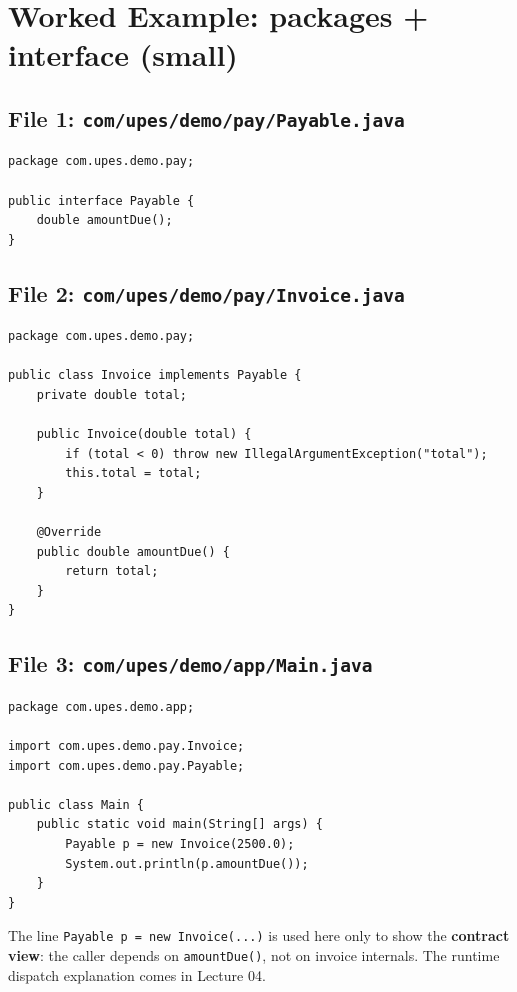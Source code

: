\documentclass[11pt]{article}
\begin{document}
\section{Worked Example: packages + interface (small)}
\subsection*{File 1: \texttt{com/upes/demo/pay/Payable.java}}
\begin{lstlisting}
package com.upes.demo.pay;

public interface Payable {
    double amountDue();
}
\end{lstlisting}

\subsection*{File 2: \texttt{com/upes/demo/pay/Invoice.java}}
\begin{lstlisting}
package com.upes.demo.pay;

public class Invoice implements Payable {
    private double total;

    public Invoice(double total) {
        if (total < 0) throw new IllegalArgumentException("total");
        this.total = total;
    }

    @Override
    public double amountDue() {
        return total;
    }
}
\end{lstlisting}

\subsection*{File 3: \texttt{com/upes/demo/app/Main.java}}
\begin{lstlisting}
package com.upes.demo.app;

import com.upes.demo.pay.Invoice;
import com.upes.demo.pay.Payable;

public class Main {
    public static void main(String[] args) {
        Payable p = new Invoice(2500.0);
        System.out.println(p.amountDue());
    }
}
\end{lstlisting}
The line \texttt{Payable p = new Invoice(...)} is used here only to show the \textbf{contract view}: the caller depends on \texttt{amountDue()}, not on invoice internals. The runtime dispatch explanation comes in Lecture 04.
\end{document}
